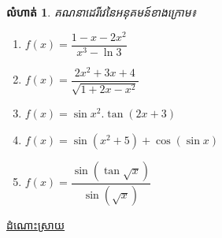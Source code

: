 \documentclass[12pt,fleqn]{book} %
\newtheorem{exercise}{\kml លំហាត់}
\newcommand{\answer}{\begin{center}
\kml \color{blue} \underline{ដំណោះស្រាយ}
\end{center}}
\begin{document}
\begin{exercise}
គណនាដេរីវេនៃអនុគមន៍ខាងក្រោម៖
\begin{multicols}{2}
\begin{enumerate}
\item $f(x)=\dfrac{1-x-2x^2}{x^3-\ln 3}$
\item $f(x)=\dfrac{2x^2+3x+4}{\sqrt{1+2x-x^2}}$
\item $f(x)=\sin x^2.\tan (2x+3)$
\item $f(x)=\sin (x^2+5)+\cos (\sin x)$
\item $f(x)=\dfrac{\sin (\tan \sqrt{x})}{\sin (\sqrt{x})}$
\end{enumerate}
\end{multicols}
\end{exercise}
\answer 
\end{document}
